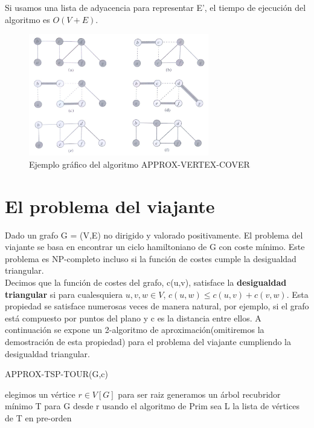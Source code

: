 \documentclass{article}
\begin{document}
Si usamos una lista de adyacencia para representar E', el tiempo de ejecuci\'on del algoritmo es $O(V + E)$.\\

\begin{figure}[H]
  \centering
    \includegraphics[width=0.7\textwidth]{vertex-cover}
  \caption{Ejemplo gráfico del algoritmo APPROX-VERTEX-COVER}
\end{figure}

\section{El problema del viajante}
Dado un grafo G = (V,E) no dirigido y valorado positivamente. El problema del viajante se basa en encontrar un ciclo hamiltoniano de G con coste mínimo. Este problema es NP-completo incluso si la función de costes cumple la desigualdad triangular.\\

Decimos que la función de costes del grafo, c(u,v), satisface la \textbf{desigualdad triangular} si para cualesquiera $u, v, w \in V$, $c(u,w) \leq c(u,v) + c(v,w)$. Esta propiedad se satisface numerosas veces de manera natural, por ejemplo, si el grafo está compuesto por puntos del plano y c es la distancia entre ellos. A continuación se expone un 2-algoritmo de aproximación(omitiremos la demostración de esta propiedad) para el problema del viajante cumpliendo la desigualdad triangular.

\begin{algorithm}[H]
\caption{APPROX-TSP-TOUR(G,c)}
\begin{algorithmic}[1]
\STATE elegimos un vértice $r \in V[G]$ para ser raiz
\STATE generamos un árbol recubridor mínimo T para G desde r usando el algoritmo de Prim
\STATE sea L la lista de vértices de T en pre-orden
\end{algorithmic}
\end{algorithm}
\end{document}
